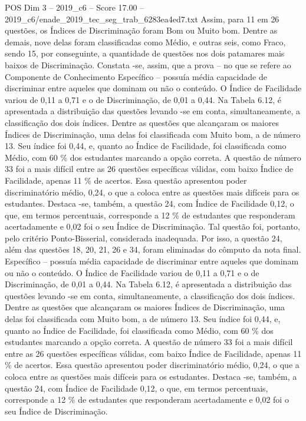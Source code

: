 \begin{textsample}{POS Dim 3 – 2019\_c6 – Score 17.00 – 2019\_c6/enade\_2019\_tec\_seg\_trab\_6283ea4ed7.txt}
Assim, para 11 em 26 questões, os Índices de Discriminação foram Bom ou Muito bom.
Dentre as demais, nove delas foram classificadas como Médio, e outras seis, como Fraco, sendo 15, por conseguinte, a quantidade de questões nos dois patamares mais baixos de Discriminação.
Constata -se, assim, que a prova – no que se refere ao Componente de Conhecimento Específico – possuía média capacidade de discriminar entre aqueles que dominam ou não o conteúdo.
O Índice de Facilidade variou de 0,11 a 0,71 e o de Discriminação, de 0,01 a 0,44.
Na Tabela 6.12, é apresentada a distribuição das questões levando -se em conta, simultaneamente, a classificação dos dois índices.
Dentre as questões que alcançaram os maiores Índices de Discriminação, uma delas foi classificada com Muito bom, a de número 13.
Seu índice foi 0,44, e, quanto ao Índice de Facilidade, foi classificada como Médio, com 60 \% dos estudantes marcando a opção correta.
A questão de número 33 foi a mais difícil entre as 26 questões específicas válidas, com baixo Índice de Facilidade, apenas 11 \% de acertos.
Essa questão apresentou poder discriminatório médio, 0,24, o que a coloca entre as questões mais difíceis para os estudantes.
Destaca -se, também, a questão 24, com Índice de Facilidade 0,12, o que, em termos percentuais, corresponde a 12 \% de estudantes que responderam acertadamente e 0,02 foi o seu Índice de Discriminação.
Tal questão foi, portanto, pelo critério Ponto-Bisserial, considerada inadequada.
Por isso, a questão 24, além das questões 18, 20, 21, 26 e 34, foram eliminadas do cômputo da nota final.
Específico – possuía média capacidade de discriminar entre aqueles que dominam ou não o conteúdo.
O Índice de Facilidade variou de 0,11 a 0,71 e o de Discriminação, de 0,01 a 0,44.
Na Tabela 6.12, é apresentada a distribuição das questões levando -se em conta, simultaneamente, a classificação dos dois índices.
Dentre as questões que alcançaram os maiores Índices de Discriminação, uma delas foi classificada com Muito bom, a de número 13.
Seu índice foi 0,44, e, quanto ao Índice de Facilidade, foi classificada como Médio, com 60 \% dos estudantes marcando a opção correta.
A questão de número 33 foi a mais difícil entre as 26 questões específicas válidas, com baixo Índice de Facilidade, apenas 11 \% de acertos.
Essa questão apresentou poder discriminatório médio, 0,24, o que a coloca entre as questões mais difíceis para os estudantes.
Destaca -se, também, a questão 24, com Índice de Facilidade 0,12, o que, em termos percentuais, corresponde a 12 \% de estudantes que responderam acertadamente e 0,02 foi o seu Índice de Discriminação.

\end{textsample}
